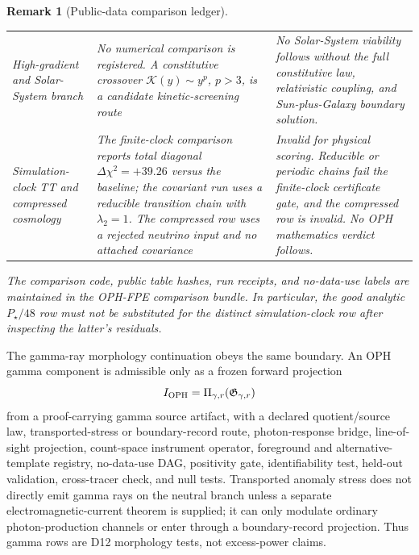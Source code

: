 \documentclass[11pt]{article}
\newtheorem{remark}[theorem]{Remark}
\begin{document}
\begin{remark}[Public-data comparison ledger]
\begin{center}
\begin{tabular}{@{}>{\raggedright\arraybackslash}p{}>{\raggedright\arraybackslash}p{}>{\raggedright\arraybackslash}p{}@{}}
High-gradient and Solar-System branch &
No numerical comparison is registered. A constitutive crossover \(\mathcal K(y)\sim y^p\), \(p>3\), is a candidate kinetic-screening route &
No Solar-System viability follows without the full constitutive law, relativistic coupling, and Sun-plus-Galaxy boundary solution.\\
Simulation-clock TT and compressed cosmology &
The finite-clock comparison reports total diagonal
\(\Delta\chi^2=+39.26\) versus the baseline; the covariant run uses a reducible
transition chain with \(\lambda_2=1\). The compressed row uses a rejected
neutrino input and no attached covariance &
Invalid for physical scoring. Reducible or periodic chains fail the
finite-clock certificate gate, and the compressed row is invalid. No
OPH mathematics verdict follows.\\
\bottomrule
\end{tabular}
\end{center}
The comparison code, public table hashes, run receipts, and no-data-use labels
are maintained in the OPH-FPE comparison bundle.  In particular, the good
analytic \(P_\star/48\) row must not be substituted for the distinct
simulation-clock row after inspecting the latter's residuals.
\end{remark}

The gamma-ray morphology continuation obeys the same boundary. An OPH gamma
component is admissible only as
a frozen forward projection
\[
I_{\rm OPH}=\Pi_{\gamma,r}(\mathfrak G_{\gamma,r})
\]
from a proof-carrying gamma source artifact, with a declared quotient/source
law, transported-stress or boundary-record route, photon-response bridge,
line-of-sight projection, count-space instrument operator, foreground and
alternative-template registry, no-data-use DAG, positivity gate, identifiability
test, held-out validation, cross-tracer check, and null tests. Transported
anomaly stress does not directly emit gamma rays on the neutral branch unless a
separate electromagnetic-current theorem is supplied; it can only modulate
ordinary photon-production channels or enter through a boundary-record
projection. Thus gamma rows are D12 morphology tests, not excess-power claims.
\end{document}
